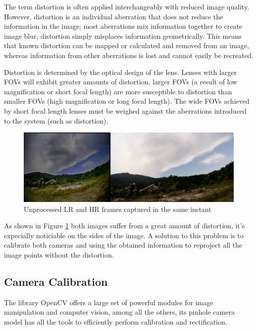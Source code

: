 The term distortion is often applied interchangeably with reduced image quality. However, distortion is an individual aberration that does not reduce the information in the image; most aberrations mix information together to create image blur, distortion simply misplaces information geometrically. This means that known distortion can be mapped or calculated and removed from an image, whereas information from other aberrations is lost and cannot easily be recreated.

Distortion is determined by the optical design of the lens. Lenses with larger FOVs will exhibit greater amounts of distortion, larger FOVs (a result of low magnification or short focal length) are more susceptible to distortion than smaller FOVs (high magnification or long focal length). The wide FOVs achieved by short focal length lenses must be weighed against the aberrations introduced to the system (such as distortion)\cite{distortion}.

\begin{figure}[h]
  \centering
  \includegraphics[scale=0.25]{figures/OG_sbs.png}
  \caption{Unprocessed LR and HR frames captured in the same instant}
  \label{img:og_sbs}
\end{figure}

As shown in Figure \ref{img:og_sbs} both images suffer from a great amount of distortion, it's expecially noticiable on the sides of the image. A solution to this problem is to calibrate both cameras and using the obtained information to reproject all the image points without the distortion.

\subsection {Camera Calibration}
\label{subsec:camera_calib}

The library OpenCV\cite{opencv} offers a large set of powerful modules for image manipulation and computer vision, among all the others, its pinhole camera model has all the tools to efficiently perform calibration and rectification.


